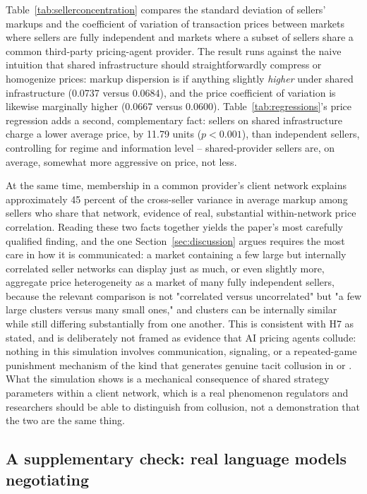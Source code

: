 \documentclass[review]{elsarticle}
\begin{document}
Table~\ref{tab:sellerconcentration} compares the standard deviation of sellers' markups and the coefficient of variation of transaction prices between markets where sellers are fully independent and markets where a subset of sellers share a common third-party pricing-agent provider. The result runs against the naive intuition that shared infrastructure should straightforwardly compress or homogenize prices: markup dispersion is if anything slightly \emph{higher} under shared infrastructure (0.0737 versus 0.0684), and the price coefficient of variation is likewise marginally higher (0.0667 versus 0.0600). Table~\ref{tab:regressions}'s price regression adds a second, complementary fact: sellers on shared infrastructure charge a lower average price, by 11.79 units ($p<0.001$), than independent sellers, controlling for regime and information level -- shared-provider sellers are, on average, somewhat more aggressive on price, not less.

At the same time, membership in a common provider's client network explains approximately 45 percent of the cross-seller variance in average markup among sellers who share that network, evidence of real, substantial within-network price correlation. Reading these two facts together yields the paper's most carefully qualified finding, and the one Section~\ref{sec:discussion} argues requires the most care in how it is communicated: a market containing a few large but internally correlated seller networks can display just as much, or even slightly more, aggregate price heterogeneity as a market of many fully independent sellers, because the relevant comparison is not "correlated versus uncorrelated" but "a few large clusters versus many small ones," and clusters can be internally similar while still differing substantially from one another. This is consistent with H7 as stated, and is deliberately not framed as evidence that AI pricing agents collude: nothing in this simulation involves communication, signaling, or a repeated-game punishment mechanism of the kind that generates genuine tacit collusion in \citet{calvano2020artificial} or \citet{klein2021autonomous}. What the simulation shows is a mechanical consequence of shared strategy parameters within a client network, which is a real phenomenon regulators and researchers should be able to distinguish from collusion, not a demonstration that the two are the same thing.

\FloatBarrier
\subsection{A supplementary check: real language models negotiating}
\label{sec:results-llm}
\end{document}
